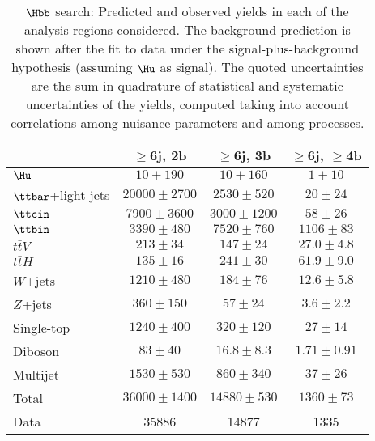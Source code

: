 \begin{table}[htbp]
\begin{center}
\begin{tabular}{l*{3}{c}}
\hline\hline
 & $\geq$6j, 2b & $\geq$6j, 3b & $\geq$6j, $\geq$4b \\
\hline
$\Hu$ &   $ 10 \pm 190 $ &   $ 10 \pm 160 $ &   $ 1 \pm 10 $ \\ 
\hline
$\ttbar$+light-jets  &   $ 20000 \pm 2700 $ &   $ 2530 \pm 520 $ &   $ 20 \pm 24 $ \\ 
$\ttcin$  &   $ 7900 \pm 3600 $ &   $ 3000 \pm 1200 $ &   $ 58 \pm 26 $ \\ 
$\ttbin$  &   $ 3390 \pm 480 $ &   $ 7520 \pm 760 $ &   $ 1106 \pm 83 $ \\ 
$t\bar{t}V$  &   $ 213 \pm 34 $ &   $ 147 \pm 24 $ &   $ 27.0 \pm 4.8 $ \\ 
$t\bar{t}H$  &   $ 135 \pm 16 $ &   $ 241 \pm 30 $ &   $ 61.9 \pm 9.0 $ \\ 
$W$+jets  &   $ 1210 \pm 480 $ &   $ 184 \pm 76 $ &   $ 12.6 \pm 5.8 $ \\ 
$Z$+jets  &   $ 360 \pm 150 $ &   $ 57 \pm 24 $ &   $ 3.6 \pm 2.2 $ \\ 
Single-top  &   $ 1240 \pm 400 $ &   $ 320 \pm 120 $ &   $ 27 \pm 14 $ \\ 
Diboson  &   $ 83 \pm 40 $ &   $ 16.8 \pm 8.3 $ &   $ 1.71 \pm 0.91 $ \\ 
Multijet  &   $ 1530 \pm 530 $ &   $ 860 \pm 340 $ &   $ 37 \pm 26 $ \\ 
\hline
Total &   $ 36000 \pm 1400 $ &   $ 14880 \pm 530 $ &   $ 1360 \pm 73 $ \\ 
\hline
Data & 35886  & 14877  & 1335  \\
\hline\hline      
\end{tabular}

%
\end{center}
\caption{
$\Hbb$ search: Predicted and observed yields in each of the analysis regions considered.
The background prediction is shown after the fit to data under the signal-plus-background hypothesis (assuming $\Hu$ as signal).
The quoted uncertainties are the sum in quadrature of statistical and systematic uncertainties of the yields, 
computed taking into account correlations among nuisance parameters and among processes.
}
\label{tab:Hbb_Postfit_Yields_Unblind_Hu}
\end{table}
